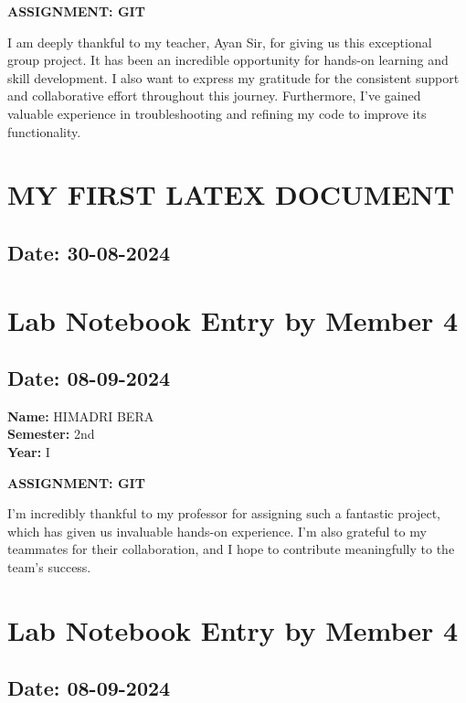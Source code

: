 \documentclass[12pt]{article}
\begin{document}
\begin{center}
\Huge \textbf{ASSIGNMENT: GIT}
\end{center}

I am deeply thankful to my teacher, Ayan Sir, for giving us this exceptional group project. It has been an incredible opportunity for hands-on learning and skill development. I also want to express my gratitude for the consistent support and collaborative effort throughout this journey. Furthermore, I've gained valuable experience in troubleshooting and refining my code to improve its functionality.

\newpage
\section{MY FIRST LATEX DOCUMENT}
\subsection*{Date: 30-08-2024}
\newpage
\section{Lab Notebook Entry by Member 4}
\subsection*{Date: 08-09-2024}

\begin{flushright}
\textbf{Name:} HIMADRI BERA \\
\textbf{Semester:} 2nd \\
\textbf{Year:} I \\
\end{flushright}

\begin{center}
\Huge \textbf{ASSIGNMENT: GIT}
\end{center}

I'm incredibly thankful to my professor for assigning such a fantastic project, which has given us invaluable hands-on experience. I'm also grateful to my teammates for their collaboration, and I hope to contribute meaningfully to the team's success.

\newpage
\section{Lab Notebook Entry by Member 4}
\subsection*{Date: 08-09-2024}
\newpage
\end{document}
